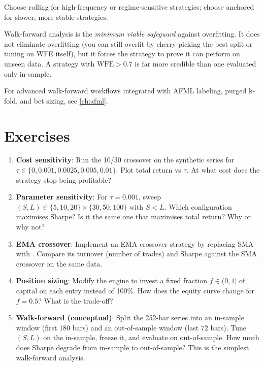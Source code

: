 Choose rolling for high-frequency or regime-sensitive strategies; choose
anchored for slower, more stable strategies.

\begin{keyinsight}
Walk-forward analysis is the \emph{minimum viable safeguard} against
overfitting. It does not eliminate overfitting (you can still overfit
by cherry-picking the best split or tuning on WFE itself), but it forces
the strategy to prove it can perform on unseen data. A strategy with
$\text{WFE} > 0.7$ is far more credible than one evaluated only in-sample.
\end{keyinsight}

For advanced walk-forward workflows integrated with AFML labeling, purged
k-fold, and bet sizing, see \cref{ch:afml}.

\section{Exercises}

\begin{enumerate}
    \item \textbf{Cost sensitivity}: Run the 10/30 crossover on the synthetic
      series for $\tau \in \{0, 0.001, 0.0025, 0.005, 0.01\}$. Plot total
      return vs $\tau$. At what cost does the strategy stop being profitable?

    \item \textbf{Parameter sensitivity}: For $\tau = 0.001$, sweep
      $(S, L) \in \{5, 10, 20\} \times \{30, 50, 100\}$ with $S < L$. Which
      configuration maximises Sharpe? Is it the same one that maximises total
      return? Why or why not?

    \item \textbf{EMA crossover}: Implement an EMA crossover strategy by
      replacing SMA with . Compare its turnover
      (number of trades) and Sharpe against the SMA crossover on the same
      data.

    \item \textbf{Position sizing}: Modify the engine to invest a fixed
      fraction $f \in (0, 1]$ of capital on each entry instead of 100\%.
      How does the equity curve change for $f = 0.5$? What is the trade-off?

    \item \textbf{Walk-forward (conceptual)}: Split the 252-bar series into
      an in-sample window (first 180 bars) and an out-of-sample window (last
      72 bars). Tune $(S, L)$ on the in-sample, freeze it, and evaluate on
      out-of-sample. How much does Sharpe degrade from in-sample to
      out-of-sample? This is the simplest walk-forward analysis.
\end{enumerate}

